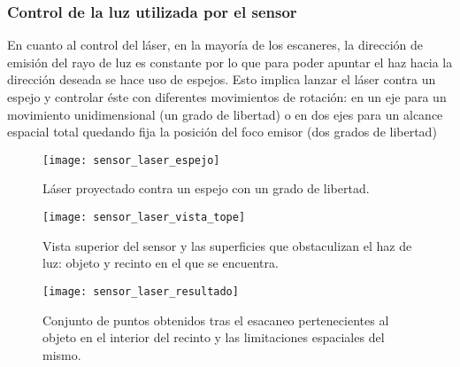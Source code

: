 \subsubsection{Control de la luz utilizada por el sensor}
\iffalse
El componente esencial en un sistema LIDAR es el rayo de luz que permite hacer las mediciones. Por lo general, hay dos tipos de LIDAR:
método coherente e incoherente o también conocido como detección de energía directa.
\\
El método incoherente mide cambios en la amplitud de la onda emitida pues al rebotar con los objetos su nivel de energía varía.
El método coherente es más apropiado para medir diferencias en la frecuencia de la onda y utiliza modulación en fase y/o frecuencia de la misma lo que le permite operar a potencias mucho más bajas a costa de utilizar un equipamiento más complejo.
\\
\\
En ambos modelos se pueden usar dos tipos diferentes de pulsos: micropulsos y sistemas de alta energía.
\\
los micropulsos surgen de la elevada capacidad computacional de las computadoras actuales. Esto deriva en un láser de baja potencia (del orden del $\mu$J) que es clasificado como seguro al ojo permitiéndose su uso bajo escasas medidas de precaución.
\\
Por otra parte, los sistemas de alta energía, requieren medidas de seguridad más estrictas y se usan principalmente para fines de investigación atmosférica pues permite tomar medidas como la altura, número de capas y densidad de las nubes, propiedades de las partículas en las nubes, temperatura, presión, concentración de gases, o humedad.
\\
\\
\fi
En cuanto al control del láser\cite{control_laser}, en la mayoría de los escaneres, la dirección de emisión del rayo de luz es constante por lo que para poder apuntar el haz hacia la dirección deseada se hace uso de espejos. Esto implica lanzar el láser contra un espejo y controlar éste con diferentes movimientos de rotación: en un eje para un movimiento unidimensional (un grado de libertad) o en dos ejes para un alcance espacial total quedando fija la posición del foco emisor (dos grados de libertad)

\begin{figure}[!htb]
  \texttt{[image: sensor\_laser\_espejo]}
  \caption{Láser proyectado contra un espejo con un grado de libertad.}\label{fig:sensor laser completo - espejo}
\endminipage\hfill
{}
  \texttt{[image: sensor\_laser\_vista\_tope]}
  \caption{Vista superior del sensor y las superficies que obstaculizan el haz de luz: objeto y recinto en el que se encuentra.}\label{fig:sensor laser completo - vista tope}
\endminipage\hfill
{}
  \texttt{[image: sensor\_laser\_resultado]}
  \caption{Conjunto de puntos obtenidos tras el esacaneo pertenecientes al objeto en el interior del recinto y las limitaciones espaciales del mismo.}\label{fig:sensor laser completo - resultado}
\endminipage
\end{figure}

